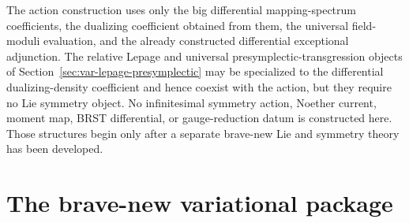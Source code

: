 \begin{remark}
\label{rem:var-action-no-noether}
The action construction uses only the big differential mapping-spectrum coefficients, the dualizing coefficient obtained from them, the universal field-moduli evaluation, and the already constructed differential exceptional adjunction.  The relative Lepage and universal presymplectic-transgression objects of Section~\ref{sec:var-lepage-presymplectic} may be specialized to the differential dualizing-density coefficient and hence coexist with the action, but they require no Lie symmetry object.  No infinitesimal symmetry action, Noether current, moment map, BRST differential, or gauge-reduction datum is constructed here.  Those structures begin only after a separate brave-new Lie and symmetry theory has been developed.
\end{remark}

\section{The brave-new variational package}
\label{sec:var-final-package}

